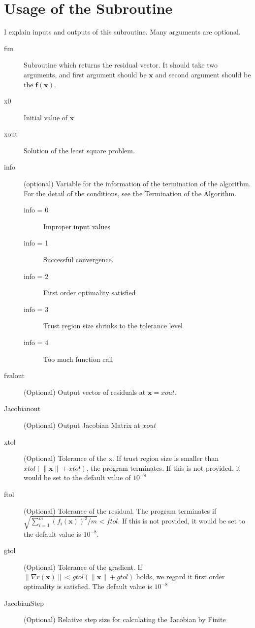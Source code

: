 \documentclass[12pt]{article}
\def\xb{{\mathbf{x}}}
\def\fb{{\mathbf{f}}}
\begin{document}
\section{Usage of the Subroutine}
I explain inputs and outputs of this subroutine. Many arguments are optional. 
\begin{description}
    \item[fun] Subroutine which returns the residual vector. It should take two arguments, and
      first argument should be $\xb$ and second argument should be the $\fb(\xb)$.
    \item[x0] Initial value of $\xb$
    \item[xout] Solution of the least square problem.
    \item[info] (optional) Variable for the information of the termination of the algorithm. For
      the detail of the conditions, see the Termination of the Algorithm. 
    \begin{description}
        \item[info = 0] Improper input values
        \item[info = 1] Successful convergence. 
        \item[info = 2] First order optimality satisfied
        \item[info = 3] Trust region size shrinks to the tolerance level
        \item[info = 4] Too much function call
    \end{description}
    \item[fvalout] (Optional) Output vector of residuals at $\xb = xout$.
    \item[Jacobianout]  (Optional) Output Jacobian Matrix at $xout$
    \item[xtol] (Optional) Tolerance of the x. If trust region size is smaller than
      $xtol(\|\xb\|+xtol)$, the program terminates. If this is not provided, it would be set to
      the default value of $10^{-8}$
    \item[ftol] (Optional) Tolerance of the residual. The program terminates if
      $\sqrt{\sum_{i=1}^m(f_i(\xb))^2/m} < ftol $. If this is not provided, it would be set to
      the default value is $10^{-8}$.
    \item[gtol] (Optional)  Tolerance of the gradient. If  $ \|\nabla r(\xb)\| <
      gtol(\|\xb\|+gtol)$ holds, we regard it first order optimality is satisfied. The default
      value is $10^{-8}$
    \item[JacobianStep] (Optional) Relative step size for calculating the Jacobian by Finite

\end{description}
\end{document}
